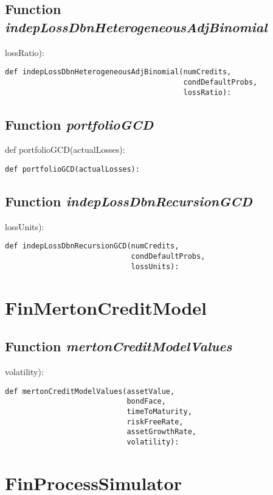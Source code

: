 \documentclass[twoside,11pt]{book}
\begin{document}
\subsection{Function {\it indepLossDbnHeterogeneousAdjBinomial}}
lossRatio):

\begin{lstlisting}
def indepLossDbnHeterogeneousAdjBinomial(numCredits,
                                         condDefaultProbs,
                                         lossRatio):
\end{lstlisting}

\subsection{Function {\it portfolioGCD}}
def portfolioGCD(actualLosses):

\begin{lstlisting}
def portfolioGCD(actualLosses):
\end{lstlisting}

\subsection{Function {\it indepLossDbnRecursionGCD}}
lossUnits):

\begin{lstlisting}
def indepLossDbnRecursionGCD(numCredits,
                             condDefaultProbs,
                             lossUnits):
\end{lstlisting}

\newpage
\section{FinMertonCreditModel}

\subsection{Function {\it mertonCreditModelValues}}
volatility):

\begin{lstlisting}
def mertonCreditModelValues(assetValue,
                            bondFace,
                            timeToMaturity,
                            riskFreeRate,
                            assetGrowthRate,
                            volatility):
\end{lstlisting}

\newpage
\section{FinProcessSimulator}
\end{document}
